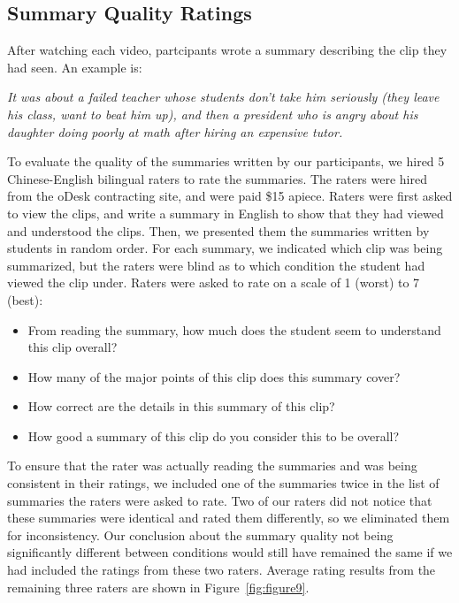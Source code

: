 \documentclass{sigchi}
\begin{document}
\subsection{Summary Quality Ratings}

After watching each video, partcipants wrote a summary describing the clip they had seen. An example is:

\emph{It was about a failed teacher whose students don't take him seriously (they leave his class, want to beat him up), and then a president who is angry about his daughter doing poorly at math after hiring an expensive tutor.}

To evaluate the quality of the summaries written by our participants, we hired 5 Chinese-English bilingual raters to rate the summaries. The raters were hired from the oDesk contracting site, and were paid \$15 apiece. Raters were
first asked to view the clips, and write a summary in English to show that they had viewed and understood the clips.
Then, we presented them the summaries
written by students in random order. For each summary, we indicated which clip was being summarized, but the raters were blind as to which condition the student had viewed the clip under. Raters were asked to rate on a scale of 1 (worst) to 7 (best):

\begin{itemize}[noitemsep]
\item From reading the summary, how much does the student seem to understand this clip overall? %
\item How many of the major points of this clip does this summary cover? %
\item How correct are the details in this summary of this clip? %
\item How good a summary of this clip do you consider this to be overall? %
\end{itemize}

To ensure that the rater was actually reading the summaries and
was being consistent in their ratings,
we included one of the summaries twice in the list of summaries the
raters were asked to rate.
Two of our raters did not notice that these summaries were identical and
rated them differently, so we eliminated them for inconsistency.
Our conclusion about the summary quality not being significantly different between conditions would still have remained the same if we had included the ratings from these two raters.
Average rating results from the remaining three raters are shown in Figure~\ref{fig:figure9}.
\end{document}
